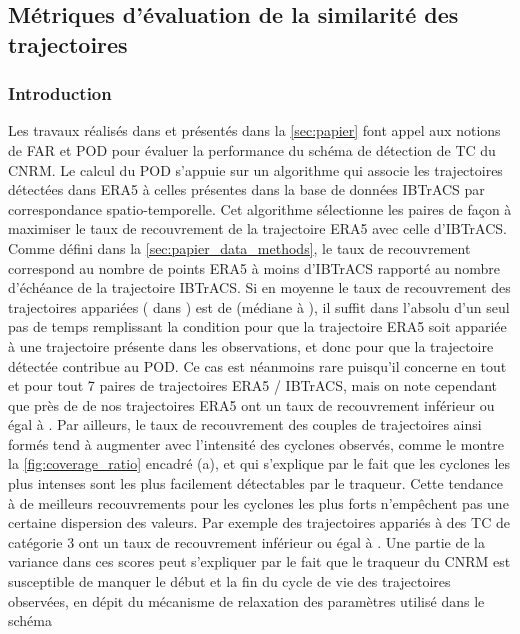 \documentclass[../main.tex]{subfiles}
\begin{document}
\subsection{Métriques d'évaluation de la similarité des trajectoires}\label{sec:similarité}

\subsubsection*{Introduction}

Les travaux réalisés dans \textcite{dulac_assessing_2023} et présentés dans la \cref{sec:papier} font appel aux notions de FAR et POD pour évaluer la
performance du schéma de détection de TC du CNRM. Le calcul du POD s'appuie sur un algorithme qui associe les trajectoires détectées dans ERA5 à celles
présentes dans la base de données IBTrACS par correspondance spatio-temporelle. Cet algorithme sélectionne les paires de façon à maximiser le taux de
recouvrement de la trajectoire ERA5 avec celle d'IBTrACS. Comme défini dans la \cref{sec:papier_data_methods}, le taux de recouvrement correspond au nombre de
points ERA5 à moins  d'IBTrACS rapporté au nombre d'échéance de la trajectoire IBTrACS. Si en moyenne le taux de recouvrement des trajectoires appariées
( dans \textcite{dulac_assessing_2023}) est de  (médiane à ), il suffit dans l'absolu d'un seul pas de temps
remplissant la condition pour que la trajectoire ERA5 soit appariée à une trajectoire présente dans les observations, et donc pour que la trajectoire détectée
contribue au POD. Ce cas est néanmoins rare puisqu'il concerne en tout et pour tout \num{7} paires de trajectoires ERA5 / IBTrACS, mais on note cependant que
près de  de nos trajectoires ERA5 ont un taux de recouvrement inférieur ou égal à . Par ailleurs, le taux de recouvrement des couples de
trajectoires ainsi formés tend à augmenter avec l'intensité des cyclones observés, comme le montre la \cref{fig:coverage_ratio} encadré (a), et qui s'explique
par le fait que les cyclones les plus intenses sont les plus facilement détectables par le traqueur. Cette tendance à de meilleurs recouvrements pour les
cyclones les plus forts n'empêchent pas une certaine dispersion des valeurs. Par exemple  des trajectoires appariés à des TC de catégorie \num{3} ont un
taux de recouvrement inférieur ou égal à . Une partie de la variance dans ces scores peut s'expliquer par le fait que le traqueur du CNRM est
susceptible de manquer le début et la fin du cycle de vie des trajectoires observées, en dépit du mécanisme de relaxation des paramètres utilisé dans le schéma
\end{document}
